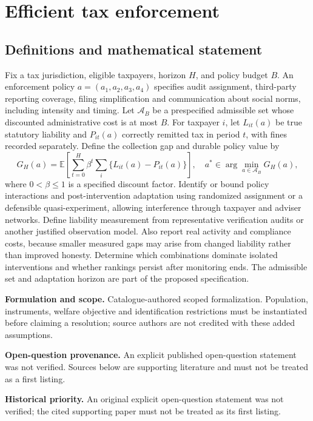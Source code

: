 \documentclass[11pt]{article}
\begin{document}
\section*{Efficient tax enforcement}\label{30007759}
\subsection{Definitions and mathematical statement}
Fix a tax jurisdiction, eligible taxpayers, horizon \(H\), and policy budget \(B\). An enforcement policy \(a=(a_1,a_2,a_3,a_4)\) specifies audit assignment, third-party reporting coverage, filing simplification and communication about social norms, including intensity and timing. Let \(\mathcal A_B\) be a prespecified admissible set whose discounted administrative cost is at most \(B\). For taxpayer \(i\), let \(L_{it}(a)\) be true statutory liability and \(P_{it}(a)\) correctly remitted tax in period \(t\), with fines recorded separately. Define the collection gap and durable policy value by
\[G_H(a)=\mathbb E\!\left[\sum_{t=0}^H\beta^t\sum_i\{L_{it}(a)-P_{it}(a)\}\right],\quad a^*\in\arg\min_{a\in\mathcal A_B}G_H(a),\]
where \(0<\beta\leq1\) is a specified discount factor. Identify or bound policy interactions and post-intervention adaptation using randomized assignment or a defensible quasi-experiment, allowing interference through taxpayer and adviser networks. Define liability measurement from representative verification audits or another justified observation model. Also report real activity and compliance costs, because smaller measured gaps may arise from changed liability rather than improved honesty. Determine which combinations dominate isolated interventions and whether rankings persist after monitoring ends. The admissible set and adaptation horizon are part of the proposed specification.

\par\textbf{Formulation and scope.} Catalogue-authored scoped formalization. Population, instruments, welfare objective and identification restrictions must be instantiated before claiming a resolution; source authors are not credited with these added assumptions.

\par\textbf{Open-question provenance.} An explicit published open-question statement was not verified. Sources below are supporting literature and must not be treated as a first listing.

\par\textbf{Historical priority.} An original explicit open-question statement was not verified; the cited supporting paper must not be treated as its first listing.
\end{document}
